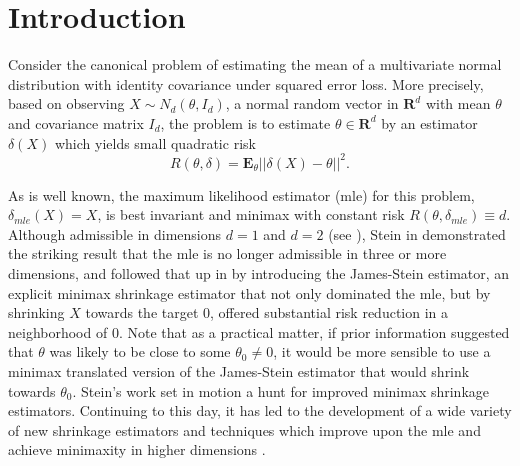 \documentclass[11pt]{article}
\theoremstyle{definition}
\begin{document}
\section{Introduction}

Consider the canonical problem of estimating the mean of a multivariate normal distribution with identity covariance under squared error loss.  More precisely, based on observing $X \sim N_d(\theta,I_d)$,  a normal random vector in $\mathbf{R}^d$  with mean  $\theta$ and  covariance matrix $I_d$, the problem is to estimate $\theta \in \mathbf{R}^d$ by an estimator $\delta(X)$ which yields small quadratic risk 
\begin{equation}   \label{Quadraticloss}  
 R(\theta, \delta) = \mathbf{E}_{\theta}||\delta(X) - \theta||^2.
\end{equation}

As is well known, the maximum likelihood estimator (mle) for this problem, $\delta_{mle}(X) = X$, is best invariant and minimax with constant risk $ R(\theta, \delta_{mle}) \equiv d$. Although admissible in dimensions $d=1$ and $d=2$  (see \cite{hodges1951some, james1961proceedings}),   Stein in \cite{stein1956} demonstrated the striking  result that the mle is no longer admissible  in three or more dimensions, and followed that up in \cite{james1961proceedings} by introducing the James-Stein estimator, an explicit minimax shrinkage estimator that not only dominated the mle, but by shrinking $X$ towards the target 0, offered substantial risk reduction in a neighborhood of $0$.   Note that as a practical matter, if prior information suggested that $\theta$ was likely to be close to some $\theta_0 \ne 0$, it would be more sensible to use a minimax translated version of the James-Stein estimator that would shrink towards $\theta_0$.  Stein's work set in motion a hunt for improved minimax shrinkage estimators. 
Continuing to this day, it has led to the development of a wide variety of new shrinkage estimators and techniques which improve upon the mle and achieve minimaxity in higher dimensions \cite{FSW2018}. 
\end{document}
